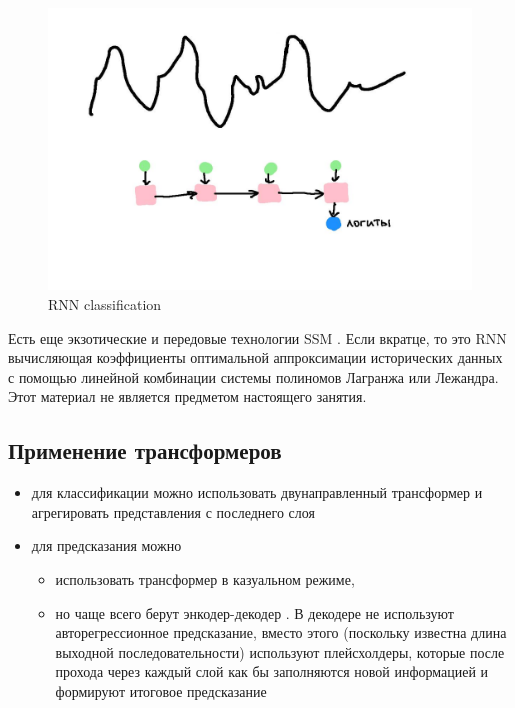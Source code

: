 \documentclass[12pt,fleqn]{article}
\begin{document}
\begin{figure}[!htb]
\begin{minipage}{0.45\linewidth}
        \includegraphics[width=\linewidth]{illustrations/rnn-clf-1.jpg}
        \caption{RNN classification}
        \label{fig:mlp-classification}
    \end{minipage}
\end{figure}

Есть еще экзотические и передовые технологии SSM \cite{ssm}. Если вкратце, то это RNN вычисляющая коэффициенты оптимальной аппроксимации исторических данных с помощью линейной комбинации системы полиномов Лагранжа или Лежандра. Этот материал не является предметом настоящего занятия.

\subsection{Применение трансформеров}

\begin{itemize}
    \item для классификации можно использовать двунаправленный трансформер и агрегировать представления с последнего слоя
    \item для предсказания можно
    \begin{itemize}
        \item использовать трансформер в казуальном режиме,
        \item но чаще всего берут энкодер-декодер \cite{informer, nst}. В декодере не используют авторегрессионное предсказание, вместо этого (поскольку известна длина выходной последовательности) используют плейсхолдеры, которые после прохода через каждый слой как бы заполняются новой информацией и формируют итоговое предсказание
    \end{itemize}
\end{itemize}
\end{document}

